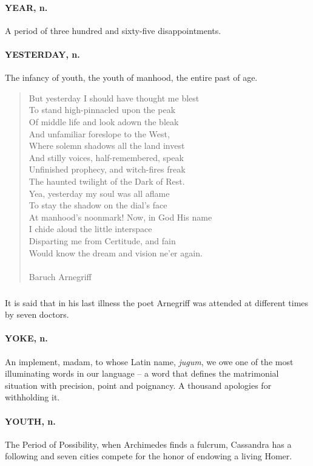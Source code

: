 \documentclass[11pt]{article}
\begin{document}
\paragraph{YEAR, n.}  A period of three hundred and sixty-five disappointments.

\paragraph{YESTERDAY, n.}  The infancy of youth, the youth of manhood, the entire
past of age.
\begin{quote}   But yesterday I should have thought me blest \\
      To stand high-pinnacled upon the peak \\
      Of middle life and look adown the bleak \\
  And unfamiliar foreslope to the West, \\
  Where solemn shadows all the land invest \\
      And stilly voices, half-remembered, speak \\
      Unfinished prophecy, and witch-fires freak \\
  The haunted twilight of the Dark of Rest. \\
  Yea, yesterday my soul was all aflame \\
      To stay the shadow on the dial's face \\
  At manhood's noonmark!  Now, in God His name \\
      I chide aloud the little interspace \\
  Disparting me from Certitude, and fain \\
  Would know the dream and vision ne'er again. \\
 \\
Baruch Arnegriff \end{quote}


\subparagraph{}   It is said that in his last illness the poet Arnegriff was
attended at different times by seven doctors.

\paragraph{YOKE, n.}  An implement, madam, to whose Latin name, {\em jugum}, we owe
one of the most illuminating words in our language -- a word that
defines the matrimonial situation with precision, point and poignancy.
A thousand apologies for withholding it.

\paragraph{YOUTH, n.}  The Period of Possibility, when Archimedes finds a fulcrum,
Cassandra has a following and seven cities compete for the honor of
endowing a living Homer.
\end{document}
